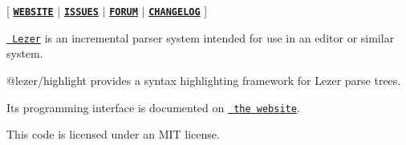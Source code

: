 \mbox{[} \href{http://lezer.codemirror.net}{\texttt{ {\bfseries{W\+E\+B\+S\+I\+TE}}}} $\vert$ \href{https://github.com/lezer-parser/lezer/issues}{\texttt{ {\bfseries{I\+S\+S\+U\+ES}}}} $\vert$ \href{https://discuss.codemirror.net/c/lezer}{\texttt{ {\bfseries{F\+O\+R\+UM}}}} $\vert$ \href{https://github.com/lezer-parser/highlight/blob/master/CHANGELOG.md}{\texttt{ {\bfseries{C\+H\+A\+N\+G\+E\+L\+OG}}}} \mbox{]}

\href{https://lezer.codemirror.net/}{\texttt{ Lezer}} is an incremental parser system intended for use in an editor or similar system.

@lezer/highlight provides a syntax highlighting framework for Lezer parse trees.

Its programming interface is documented on \href{https://lezer.codemirror.net/docs/ref/\#highlight}{\texttt{ the website}}.

This code is licensed under an M\+IT license. 